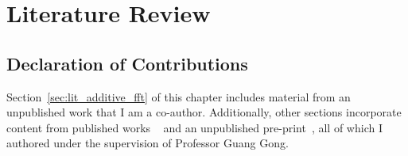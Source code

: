 \chapter{Literature Review}\label{ch:lit_review}

\section*{Declaration of Contributions}
Section~\ref{sec:lit_additive_fft} of this chapter includes material from an unpublished work that I am a co-author. Additionally, other sections incorporate content from published works ~\cite{Badakhshan2023Outline, Badakhshan2025AuroraZupply} and an unpublished pre-print~\cite{Badakhshan2024Zupply}, all of which I authored under the supervision of Professor Guang Gong.

%
%
%
%
%
%
%



